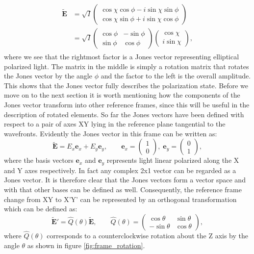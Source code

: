 \begin{align}
\begin{split}
    \bm{\tilde{E}} &=
    \sqrt{I}
    \begin{pmatrix}
    \cos \chi \cos \phi - i\sin \chi \sin \phi \\
    \cos \chi \sin \phi + i\sin \chi \cos \phi
    \end{pmatrix}
    \\
    &=
    \sqrt{I}
    \begin{pmatrix}
    \cos \phi & -\sin \phi \\
    \sin \phi & \cos \phi
    \end{pmatrix}
    \begin{pmatrix}
    \cos \chi \\
    i\sin \chi
    \end{pmatrix},
\end{split}
\end{align}
where we see that the rightmost factor is a Jones vector representing elliptical polarized light. The matrix in the middle is simply a rotation matrix that rotates the Jones vector by the angle $\phi$ and the factor to the left is the overall amplitude. This shows that the Jones vector fully describes the polarization state. Before we move on to the next section it is worth mentioning how the components of the Jones vector transform into other reference frames, since this will be useful in the description of rotated elements. So far the Jones vectors have been defined with respect to a pair of axes XY lying in the reference plane tangential to the wavefronts. Evidently the Jones vector in this frame can be written as:
\begin{equation}
    \tilde{\bm{E}} = E_x \bm{e}_x + E_y \bm{e}_y, \qquad 
    \bm{e}_x = 
    \begin{pmatrix}
    1 \\
    0
    \end{pmatrix},
    \;
    \bm{e}_y = 
    \begin{pmatrix}
    0 \\
    1
    \end{pmatrix},
\end{equation}
where the basis vectors $\bm{e}_x$ and $\bm{e}_y$ represents light linear polarized along the X and Y axes respectively. In fact any complex 2x1 vector can be regarded as a Jones vector. It is therefore clear that the Jones vectors form a vector space and with that other bases can be defined as well. Consequently, the reference frame change from XY to X'Y' can be represented by an orthogonal transformation which can be defined as:
\begin{equation}
    \tilde{\bm{E}}' = \hat{Q}(\theta) \tilde{\bm{E}}, \qquad
    \hat{Q}(\theta) =
    \begin{pmatrix}
    \cos \theta & \sin \theta \\
    -\sin \theta & \cos \theta
    \end{pmatrix},
\end{equation}
where $\hat{Q}(\theta)$ corresponds to a counterclockwise rotation about the Z axis by the angle $\theta$ as shown in figure \ref{fig:frame_rotation}. 


